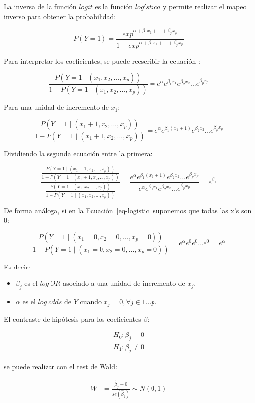 \documentclass[
  12pt,
  a4paper,
  extrafontsizes,
  onecolumn,
  openright]{memoir}
\providecommand{\tightlist}{%
  \setlength{\itemsep}{0pt}\setlength{\parskip}{0pt}}\usepackage{longtable,booktabs,array}
\begin{document}
La inversa de la función \(logit\) es la función \(logística\) y permite
realizar el mapeo inverso para obtener la probabilidad:

\[
P(Y=1) = \frac{exp^{\alpha+\beta_1x_1+...+\beta_px_p}}{1 + exp^{\alpha+\beta_1x_1+...+\beta_px_p}}
\]

Para interpretar los coeficientes, se puede reescribir la ecuación
\autocite[ver][p.~260]{frienly2015}:

\[
\frac{P(Y=1 \mid (x_1,x_2,...,x_p))}{1-P(Y=1 \mid (x_1,x_2,...,x_p))} = e^{\alpha}e^{\beta_1x_1}e^{\beta_2x_2}...e^{\beta_px_p}
\]

Para una unidad de incremento de \(x_1\):

\[
\frac{P(Y=1 \mid (x_1+1,x_2,...,x_p))}{1-P(Y=1 \mid (x_1+1,x_2,...,x_p))} = e^{\alpha}e^{\beta_1(x_1+1)}e^{\beta_2x_2}...e^{\beta_px_p}
\]

Dividiendo la segunda ecuación entre la primera:

\[
\frac{\frac{P(Y=1 \mid (x_1+1,x_2,...,x_p))}{1-P(Y=1 \mid (x_1+1,x_2,...,x_p))}}{\frac{P(Y=1 \mid (x_1,x_2,...,x_p))}{1-P(Y=1 \mid (x_1,x_2,...,x_p))}} = \frac{e^{\alpha}e^{\beta_1(x_1+1)}e^{\beta_2x_2}...e^{\beta_px_p}}{e^{\alpha}e^{\beta_1x_1}e^{\beta_2x_2}...e^{\beta_px_p}} = e^{\beta_1}
\]

De forma análoga, si en la Ecuación~\ref{eq-logistic} suponemos que
todas las x's son 0:

\[
\frac{P(Y=1 \mid (x_1=0,x_2=0,...,x_p=0))}{1-P(Y=1 \mid (x_1=0,x_2=0,...,x_p=0))} = e^{\alpha}e^0e^0...e^0 = e^{\alpha}
\]

Es decir:

\begin{itemize}
\tightlist
\item
  \(\beta_j\) es el \(log\ OR\) asociado a una unidad de incremento de
  \(x_j\).
\item
  \(\alpha\) es el \(log\ odds\) de \(Y\) cuando
  \(x_j=0, \forall j \in 1...p\).
\end{itemize}

El contraste de hipótesis para los coeficientes \(\beta\):

\[
\begin{aligned}
H_0: \beta_j =  0 \\
H_1: \beta_j \ne  0
\end{aligned}
\]

se puede realizar con el test de Wald:

\[
\begin{aligned}
W & = \frac{\hat\beta_j - 0}{se(\hat\beta_j)} \sim N(0,1)
\end{aligned}
\]
\end{document}
